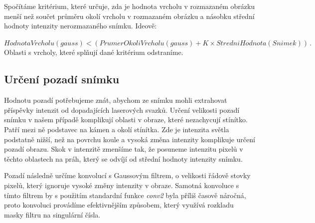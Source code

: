 Spočítáme kritérium, které určuje, zda je hodnota vrcholu v rozmazaném obrázku menší než součet průměru okolí vrcholu v rozmazaném obrázku a násobku střední hodnoty intenzity nerozmazaného snímku. Ideově: 

$ HodnotaVrcholu(gauss) < \left( PrumerOkoliVrcholu(gauss) + K\times StredniHodnota(Snimek)\right)\,.$ Oblasti s vrcholy, které splňují dané kritérium odstraníme.

%	
%	
%	


\subsection*{Určení pozadí snímku}
	Hodnotu pozadí potřebujeme znát, abychom ze snímku mohli extrahovat příspěvky intenzit od dopadajících laserových svazků. Určení velikosti pozadí snímku v našem případě komplikují oblasti v obraze, které nezachycují stínítko. Patří mezi ně podstavec na kámen a okolí stínítka. Zde je intenzita světla podstatně nižší, než na povrchu koule a vysoká změna intenzity komplikuje určení pozadí obrazu. Skok v intenzitě zmenšíme tak, že posuneme intenzitu pixelů v těchto oblastech na práh, který se odvíjí od střední hodnoty intenzity snímku. 
	
	Pozadí následně určíme konvolucí s Gaussovým filtrem, o velikosti řádově stovky pixelů, který ignoruje vysoké změny intenzity v obraze. Samotná konvoluce s tímto filtrem by s použitím standardní funkce \textit{conv2} byla příliš časově náročná, proto konvoluci provádíme efektivnějším způsobem, který využívá rozkladu masky filtru na singulární čísla.
	
